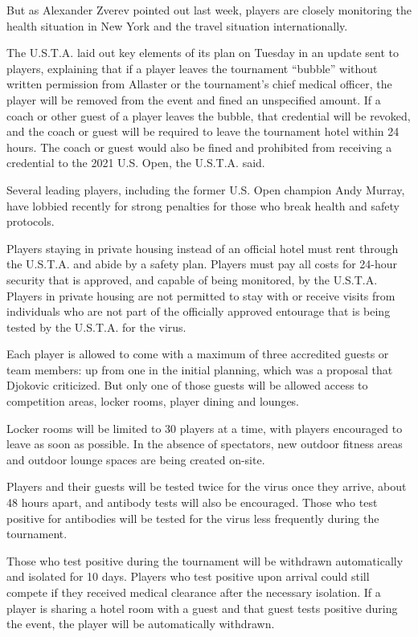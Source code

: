 But as Alexander Zverev pointed out last week, players are closely
monitoring the health situation in New York and the travel situation
internationally.

The U.S.T.A. laid out key elements of its plan on Tuesday in an update
sent to players, explaining that if a player leaves the tournament
``bubble'' without written permission from Allaster or the tournament's
chief medical officer, the player will be removed from the event and
fined an unspecified amount. If a coach or other guest of a player
leaves the bubble, that credential will be revoked, and the coach or
guest will be required to leave the tournament hotel within 24 hours.
The coach or guest would also be fined and prohibited from receiving a
credential to the 2021 U.S. Open, the U.S.T.A. said.

Several leading players, including the former U.S. Open champion Andy
Murray, have lobbied recently for strong penalties for those who break
health and safety protocols.

Players staying in private housing instead of an official hotel must
rent through the U.S.T.A. and abide by a safety plan. Players must pay
all costs for 24-hour security that is approved, and capable of being
monitored, by the U.S.T.A. Players in private housing are not permitted
to stay with or receive visits from individuals who are not part of the
officially approved entourage that is being tested by the U.S.T.A. for
the virus.

Each player is allowed to come with a maximum of three accredited guests
or team members: up from one in the initial planning, which was a
proposal that Djokovic criticized. But only one of those guests will be
allowed access to competition areas, locker rooms, player dining and
lounges.

Locker rooms will be limited to 30 players at a time, with players
encouraged to leave as soon as possible. In the absence of spectators,
new outdoor fitness areas and outdoor lounge spaces are being created
on-site.

Players and their guests will be tested twice for the virus once they
arrive, about 48 hours apart, and antibody tests will also be
encouraged. Those who test positive for antibodies will be tested for
the virus less frequently during the tournament.

Those who test positive during the tournament will be withdrawn
automatically and isolated for 10 days. Players who test positive upon
arrival could still compete if they received medical clearance after the
necessary isolation. If a player is sharing a hotel room with a guest
and that guest tests positive during the event, the player will be
automatically withdrawn.

